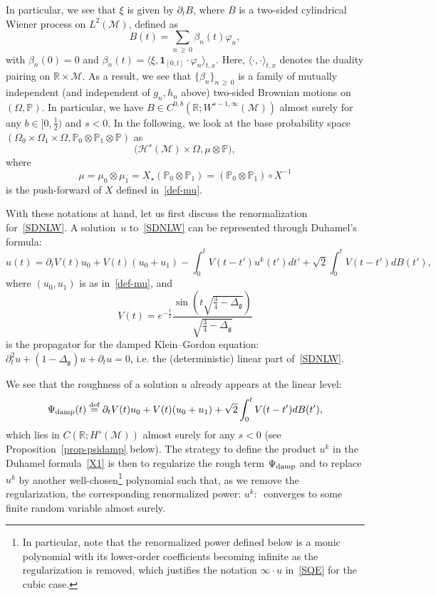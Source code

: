 \documentclass[AHL,Unicode,longabstracts,published]{cedram}
\newcommand{\damp}{\textup{damp}}
\newcommand{\R}{\mathbb{R}}
\newcommand{\Prob}{\mathbb{P}}
\newcommand{\deff}{\overset{\textup{def}}{=}}
\newcommand{\ind}{\mathbf{1}}
\newcommand{\M}{\mathcal{M}}
\renewcommand{\H}{\mathcal{H}}
\newcommand{\g}{\mathfrak{g}}
\newcommand{\be}{\beta}
\newcommand{\Dlg}{\Delta_{\g}}
\newcommand{\dt}{\partial_t}
\renewcommand{\O}{\Omega}
\newcommand{\jb}[1] {\langle #1 \rangle}
\begin{document}
In particular, we see that $\xi$ is given by $\dt B$, where $B$ is a two-sided cylindrical Wiener process on $L^2(\M)$, defined as
\begin{equation}\label{STWN}
B(t)=\sum_{n\,\geq\,0}\beta_n(t)\varphi_n,
\end{equation}
with $\be_n(0) = 0$ and $\be_n(t) = \jb{\xi, \ind_{[0, t]} \cdot \varphi_n}_{ t, x}$. Here, $\jb{\cdot, \cdot}_{t, x}$ denotes the duality pairing on $\R\times \M$. As a result, we see that $\{ \be_n \}_{n \,\ge\,0}$ is a family of mutually independent (and independent of $g_n,h_n$ above) two-sided Brownian motions on $(\O,\Prob)$. In particular, we have $B\in C^{0,b}(\R;W^{s-1,\infty}(\M))$ almost surely for any $b\in[0,\frac12)$ and $s<0$. In the following, we look at the base probability space $(\O_0\times\O_1\times\O,\Prob_0\otimes\Prob_1\otimes\Prob)$ as
\begin{equation*}
\big(\H^s(\M)\times\O,\mu\otimes\Prob\big),
\end{equation*}
where
\begin{equation*}
\mu = \mu_0\otimes\mu_1 = X_{\star}(\Prob_0\otimes\Prob_1) = (\Prob_0\otimes\Prob_1)\circ X^{-1}
\end{equation*}
is the push-forward of $X$ defined in~\eqref{def-mu}.

With these notations at hand, let us first discuss the renormalization for~\eqref{SDNLW}. A solution~$u$ to~\eqref{SDNLW} can be represented through Duhamel's formula:
\begin{equation}\label{X1}
u(t)= \dt V(t)u_0 + V(t)(u_0+u_1) - \int_0^tV(t-t')u^k(t')dt'+\sqrt{2}\int_0^tV(t-t')dB(t'),
\end{equation}
where $(u_0,u_1)$ is as in~\eqref{def-mu}, and
\begin{equation}\label{def-V}
V(t) = e^{-\frac{t}2} \frac{\sin\left(t\sqrt{\frac34-\Dlg}\right)}{\sqrt{\frac34-\Dlg}}
\end{equation}
is the propagator for the damped Klein--Gordon equation: $\dt^2 u + (1 - \Dlg) u + \dt u = 0$, i.e. the (deterministic) linear part of~\eqref{SDNLW}.

We see that the roughness of a solution $u$ already appears at the linear level:
\begin{equation}\label{def-Psidamp}
\Psi_{\damp}(t)
\deff\dt V(t)u_0 + V(t)(u_0+u_1) +\sqrt{2}\int_0^tV(t-t')dB(t'),
\end{equation}
which lies in $C(\R;H^s(\M))$ almost surely for any $s<0$ (see Proposition~\ref{prop-psidamp} below). The strategy to define the product $u^k$ in the Duhamel formula~\eqref{X1} is then to regularize the rough term $\Psi_{\damp}$ and to replace $u^k$ by another well-chosen\footnote{In particular, note that the renormalized power defined below is a monic polynomial with its lower-order coefficients becoming infinite as the regularization is removed, which justifies the notation $\infty\cdot u$ in~\eqref{SQE} for the cubic case.} polynomial such that, as we remove the regularization, the corresponding renormalized power: $\!u^{k}\!:\,$ converges to some finite random variable almost surely.
\end{document}
